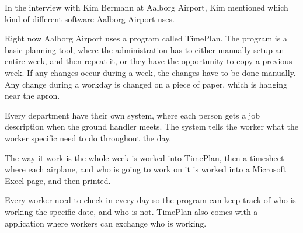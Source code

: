 
In the interview with Kim Bermann at Aalborg Airport, Kim mentioned which kind of different software Aalborg Airport uses.

Right now Aalborg Airport uses a program called TimePlan.
The program is a basic planning tool, where the administration has to either manually setup an entire week, and then repeat it, or they have the opportunity to copy a previous week.
If any changes occur during a week, the changes have to be done manually. Any change during a workday is changed on a piece of paper, which is hanging near the apron.

Every department have their own system, where each person gets a job description when the ground handler meets. The system tells the worker what the worker specific need to do throughout the day.

The way it work is the whole week is worked into TimePlan, then a timesheet where each airplane, and who is going to work on it is worked into a Microsoft Excel page, and then printed.


Every worker need to check in every day so the program can keep track of who is working the specific date, and who is not. TimePlan also comes with a application where workers can exchange who is working.






